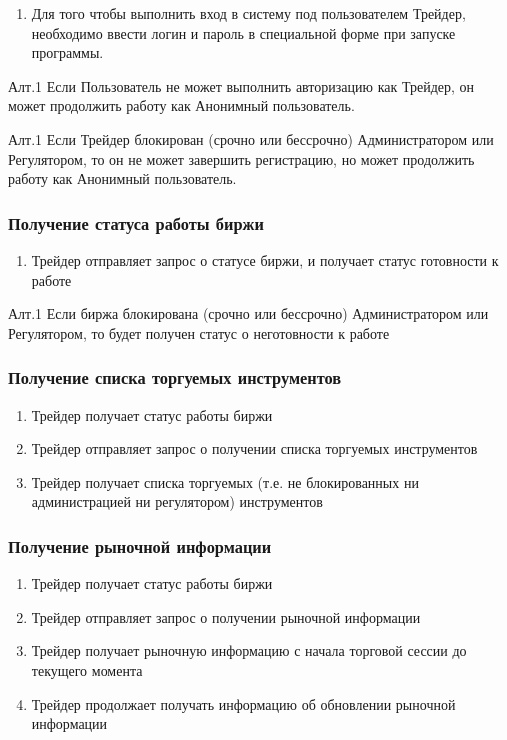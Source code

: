 \documentclass[a4paper, 12pt]{article}        %
\begin{document}
\begin{enumerate}
\item Для того чтобы выполнить вход в систему под пользователем Трейдер, необходимо ввести логин и пароль в специальной форме при запуске программы.
\end{enumerate}

Алт.1 Если Пользователь не может выполнить авторизацию как Трейдер, он может продолжить работу как Анонимный пользователь.

Алт.1 Если Трейдер блокирован (срочно или бессрочно) Администратором или Регулятором, то он не может завершить регистрацию, но может продолжить работу как Анонимный пользователь.

\subsubsection{Получение статуса работы биржи}

\begin{enumerate}
\item Трейдер отправляет запрос о статусе биржи, и получает статус готовности к работе
\end{enumerate}

Алт.1 Если биржа блокирована (срочно или бессрочно) Администратором или Регулятором, то будет получен статус о неготовности к работе

\subsubsection{Получение списка торгуемых инструментов}

\begin{enumerate}
\item Трейдер получает статус работы биржи
\item Трейдер отправляет запрос о получении списка торгуемых инструментов
\item Трейдер получает списка торгуемых (т.е. не блокированных ни администрацией ни регулятором) инструментов
\end{enumerate}

\subsubsection{Получение рыночной информации}

\begin{enumerate}
\item Трейдер получает статус работы биржи
\item Трейдер отправляет запрос о получении рыночной информации
\item Трейдер получает рыночную информацию с начала торговой сессии до текущего момента
\item Трейдер продолжает получать информацию об обновлении рыночной информации
\end{enumerate}
\end{document}
